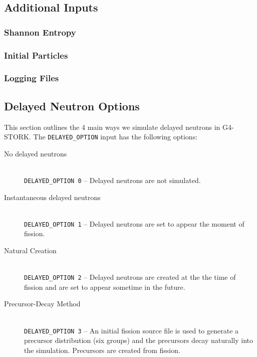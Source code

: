 \documentclass{article}
\begin{document}
\subsection{Additional Inputs}
\subsubsection{Shannon Entropy}
\subsubsection{Initial Particles}
\subsubsection{Logging Files}


\subsection{Delayed Neutron Options}
This section outlines the 4 main ways we simulate delayed neutrons in G4-STORK. The \texttt{DELAYED\_OPTION} input has the following options:
\begin{description}
    \item[No delayed neutrons] \hfill \\
    \texttt{DELAYED\_OPTION 0} -- Delayed neutrons are not simulated.
    \item[Instantaneous delayed neutrons] \hfill \\
    \texttt{DELAYED\_OPTION 1} -- Delayed neutrons are set to appear the moment of fission.
    \item[Natural Creation] \hfill \\
    \texttt{DELAYED\_OPTION 2} -- Delayed neutrons are created at the the time of fission and are set to appear sometime in the future.
    \item[Precursor-Decay Method] \hfill \\
    \texttt{DELAYED\_OPTION 3} -- An initial fission source file is used to generate a precursor distribution (six groups) and the precursors decay naturally into the simulation. Precursors are created from fission.
    
\end{description}

\end{document}
